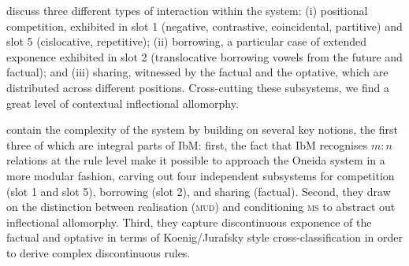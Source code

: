 \documentclass[output=paper
	        ,collection
	        ,collectionchapter
 	        ,biblatex
                ,babelshorthands
                ,newtxmath
                ,draftmode
                ,colorlinks, citecolor=brown
]{langscibook}
\begin{document}
\begin{exe}
\begin{xlist}
\begin{exe}
\begin{xlist}
\begin{table}
  \centering
{}
  \caption{Position classes of Oneida inflectional prefixes
    \citep{diaz:koenig:michelson:19}}
  \label{tab:Oneida}
\end{table}

\citet{diaz:koenig:michelson:19} discuss three different types of
interaction within the system: (i) positional competition, exhibited
in slot 1 (negative, contrastive, coincidental, partitive) and slot 5
(cislocative, repetitive); (ii) borrowing, a particular case of
extended exponence exhibited in slot 2 (translocative borrowing vowels
from the future and factual); and (iii) sharing, witnessed by the
factual and the optative, which are distributed across different
positions. Cross-cutting these subsystems, we find a great level of
contextual inflectional allomorphy.

\citet{diaz:koenig:michelson:19} contain the complexity of the system
by building on several key notions, the first three of
which are integral parts of IbM: first, the fact that IbM recognises
$m:n$ relations at the rule level make it possible to approach the
Oneida system in a more modular fashion, carving out four independent
subsystems for competition (slot 1 and slot 5), borrowing (slot 2), and
sharing (factual). Second, they draw on the distinction between
realisation (\textsc{mud}) and conditioning \textsc{ms} to abstract
out inflectional allomorphy. Third, they capture discontinuous
exponence of the factual and optative in terms of Koenig/Jurafsky
style cross-classification in order to derive complex discontinuous
rules.


\end{xlist}
\end{exe}
\end{xlist}
\end{exe}
\end{document}
